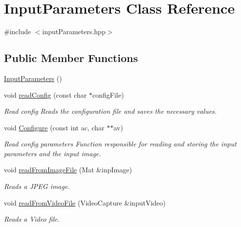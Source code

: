 \hypertarget{classInputParameters}{}\section{Input\+Parameters Class Reference}
\label{classInputParameters}


{\ttfamily \#include $<$input\+Parameters.\+hpp$>$}

\subsection*{Public Member Functions}
\begin{DoxyCompactItemize}
\item 
\mbox{\hyperlink{classInputParameters_a2ede6d73636729561755f9ca986475f8}{Input\+Parameters}} ()
\item 
void \mbox{\hyperlink{classInputParameters_ad6f1b367bcdc1dfc0264ae174d593a91}{read\+Config}} (const char $\ast$config\+File)
\begin{DoxyCompactList}\small\item\em Read config Reads the configuration file and saves the necessary values. \end{DoxyCompactList}\item 
void \mbox{\hyperlink{classInputParameters_a94b0c8eb6a4312b6097c36f1bb7a4af5}{Configure}} (const int ac, char $\ast$$\ast$av)
\begin{DoxyCompactList}\small\item\em Read config parameters Function responsible for reading and storing the input parameters and the input image. \end{DoxyCompactList}\item 
void \mbox{\hyperlink{classInputParameters_a3fbb650aef6f1e08d2bfea252d0386ee}{read\+From\+Image\+File}} (Mat \&inp\+Image)
\begin{DoxyCompactList}\small\item\em Reads a J\+P\+EG image. \end{DoxyCompactList}\item 
void \mbox{\hyperlink{classInputParameters_af582f1a851f89f9c347f85d80787943f}{read\+From\+Video\+File}} (Video\+Capture \&input\+Video)
\begin{DoxyCompactList}\small\item\em Reads a Video file. \end{DoxyCompactList}\end{DoxyCompactItemize}
